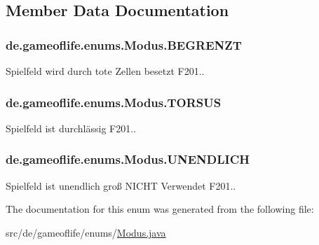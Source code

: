 \subsection{Member Data Documentation}
\hypertarget{enumde_1_1gameoflife_1_1enums_1_1Modus_ab86143d65d3407a6683dcf43b4091ca7}{
\subsubsection[{B\-E\-G\-R\-E\-N\-Z\-T}]{\setlength{\rightskip}{0pt plus 5cm}de.\-gameoflife.\-enums.\-Modus.\-B\-E\-G\-R\-E\-N\-Z\-T}}\label{enumde_1_1gameoflife_1_1enums_1_1Modus_ab86143d65d3407a6683dcf43b4091ca7}
Spielfeld wird durch tote Zellen besetzt F201.. \hypertarget{enumde_1_1gameoflife_1_1enums_1_1Modus_ac51fa8c0735f22bf9b5a995f04f30242}{
\subsubsection[{T\-O\-R\-S\-U\-S}]{\setlength{\rightskip}{0pt plus 5cm}de.\-gameoflife.\-enums.\-Modus.\-T\-O\-R\-S\-U\-S}}\label{enumde_1_1gameoflife_1_1enums_1_1Modus_ac51fa8c0735f22bf9b5a995f04f30242}
Spielfeld ist durchlässig F201.. \hypertarget{enumde_1_1gameoflife_1_1enums_1_1Modus_a12c2cd3fc19da83d151fa6a7ed06cbd2}{
\subsubsection[{U\-N\-E\-N\-D\-L\-I\-C\-H}]{\setlength{\rightskip}{0pt plus 5cm}de.\-gameoflife.\-enums.\-Modus.\-U\-N\-E\-N\-D\-L\-I\-C\-H}}\label{enumde_1_1gameoflife_1_1enums_1_1Modus_a12c2cd3fc19da83d151fa6a7ed06cbd2}
Spielfeld ist unendlich groß N\-I\-C\-H\-T Verwendet F201.. 

The documentation for this enum was generated from the following file\-:\begin{DoxyCompactItemize}
\item 
src/de/gameoflife/enums/\hyperlink{Modus_8java}{Modus.\-java}\end{DoxyCompactItemize}
